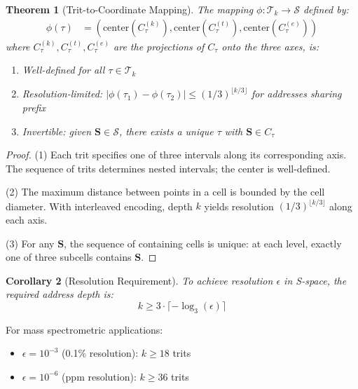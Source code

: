 \documentclass[twocolumn,10pt]{article}
\newtheorem{theorem}{Theorem}[section]
\newtheorem{corollary}[theorem]{Corollary}
\begin{document}
\begin{theorem}[Trit-to-Coordinate Mapping]
\label{thm:mapping}
The mapping $\phi: \mathcal{T}_k \to \mathcal{S}$ defined by:
\begin{align}
\phi(\tau) &= \left( \text{center}(C_\tau^{(k)}), \text{center}(C_\tau^{(t)}), \text{center}(C_\tau^{(e)}) \right)
\end{align}
where $C_\tau^{(k)}, C_\tau^{(t)}, C_\tau^{(e)}$ are the projections of $C_\tau$ onto the three axes, is:
\begin{enumerate}
\item Well-defined for all $\tau \in \mathcal{T}_k$
\item Resolution-limited: $|\phi(\tau_1) - \phi(\tau_2)| \leq (1/3)^{\lfloor k/3 \rfloor}$ for addresses sharing prefix
\item Invertible: given $\mathbf{S} \in \mathcal{S}$, there exists a unique $\tau$ with $\mathbf{S} \in C_\tau$
\end{enumerate}
\end{theorem}

\begin{proof}
(1) Each trit specifies one of three intervals along its corresponding axis. The sequence of trits determines nested intervals; the center is well-defined.

(2) The maximum distance between points in a cell is bounded by the cell diameter. With interleaved encoding, depth $k$ yields resolution $(1/3)^{\lfloor k/3 \rfloor}$ along each axis.

(3) For any $\mathbf{S}$, the sequence of containing cells is unique: at each level, exactly one of three subcells contains $\mathbf{S}$.
\end{proof}

\begin{corollary}[Resolution Requirement]
To achieve resolution $\epsilon$ in S-space, the required address depth is:
\begin{equation}
k \geq 3 \cdot \lceil -\log_3(\epsilon) \rceil
\end{equation}
\end{corollary}

For mass spectrometric applications:
\begin{itemize}
\item $\epsilon = 10^{-3}$ (0.1\% resolution): $k \geq 18$ trits
\item $\epsilon = 10^{-6}$ (ppm resolution): $k \geq 36$ trits
\end{itemize}
\end{document}
